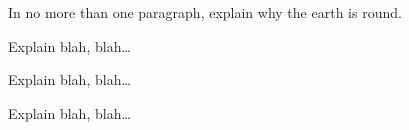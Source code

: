 \documentclass[12pt]{exam}
\begin{document}
\begin{questions}
\question[10]
In no more than one paragraph, explain why the earth is round.
\makeemptybox{2in}

\question[20]
Explain blah, blah\ldots
\makeemptybox{\fill}

\newpage

\question[20]
Explain blah, blah\ldots
\fillwithlines{\fill}

\newpage

\question[20]
Explain blah, blah\ldots
\fillwithdottedlines{8em}

\end{questions}
\end{document}
